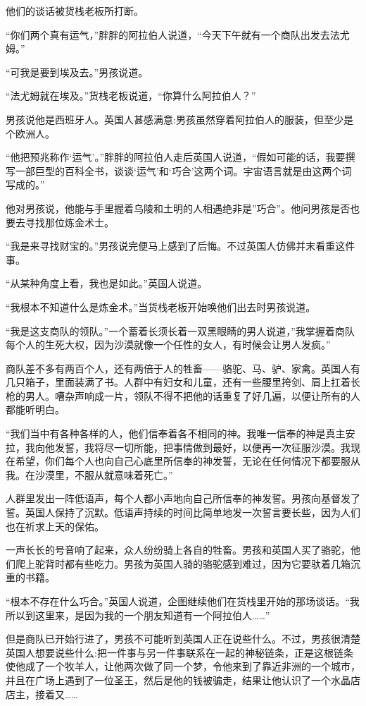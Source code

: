 \documentclass[twoside,openany]{book}
\begin{document}
他们的谈话被货栈老板所打断。

“你们两个真有运气，”胖胖的阿拉伯人说道，“今天下午就有一个商队出发去法尤姆。”

“可我是要到埃及去。”男孩说道。

“法尤姆就在埃及。”货栈老板说道，“你算什么阿拉伯人？”

男孩说他是西班牙人。英国人甚感满意:男孩虽然穿着阿拉伯人的服装，但至少是个欧洲人。

“他把预兆称作‘运气'。”胖胖的阿拉伯人走后英国人说道，“假如可能的话，我要撰写一部巨型的百科全书，谈谈‘运气'和‘巧合'这两个词。宇宙语言就是由这两个词写成的。”

他对男孩说，他能与手里握着乌陵和土明的人相遇绝非是”巧合”。他问男孩是否也要去寻找那位炼金术士。

“我是来寻找财宝的。”男孩说完便马上感到了后悔。不过英国人仿佛并末看重这件事。

“从某种角度上看，我也是如此。”英国人说道。

“我根本不知道什么是炼金术。”当货栈老板开始唤他们出去时男孩说道。

“我是这支商队的领队。”一个蓄着长须长着一双黑眼睛的男人说道，”我掌握着商队每个人的生死大权，因为沙漠就像一个任性的女人，有时候会让男人发疯。”

商队差不多有两百个人，还有两倍于人的牲畜——骆驼、马、驴、家禽。英国人有几只箱子，里面装满了书。人群中有妇女和儿童，还有一些腰里挎剑、肩上扛着长枪的男人。嘈杂声响成一片，领队不得不把他的话重复了好几遍，以便让所有的人都能听明白。

“我们当中有各种各样的人，他们信奉着各不相同的神。我唯一信奉的神是真主安拉，我向他发誓，我将尽一切所能，把事情做到最好，以便再一次征服沙漠。我现在希望，你们每个人也向自己心底里所信奉的神发誓，无论在任何情况下都要服从我。在沙漠里，不服从就意味着死亡。”

人群里发出一阵低语声，每个人都小声地向自己所信奉的神发誓。男孩向基督发了誓。英国人保持了沉默。低语声持续的时间比简单地发一次誓言要长些，因为人们也在祈求上天的保佑。

一声长长的号音响了起来，众人纷纷骑上各自的牲畜。男孩和英国人买了骆驼，他们爬上驼背时都有些吃力。男孩为英国人骑的骆驼感到难过，因为它要驮着几箱沉重的书籍。

“根本不存在什么巧合。”英国人说道，企图继续他们在货栈里开始的那场谈话。“我所以到这里来，是因为我的一个朋友知道有一个阿拉伯人……”

但是商队已开始行进了，男孩不可能听到英国人正在说些什么。不过，男孩很清楚英国人想要说些什么:把一件事与另一件事联系在一起的神秘链条，正是这根链条使他成了一个牧羊人，让他两次做了同一个梦，令他来到了靠近非洲的一个城市，并且在广场上遇到了一位圣王，然后是他的钱被骗走，结果让他认识了一个水晶店店主，接着又……
\end{document}

